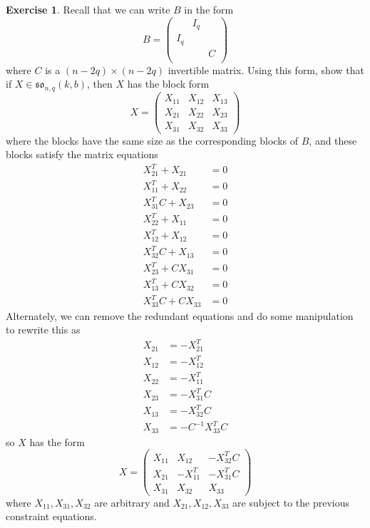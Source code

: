 \documentclass[12pt]{article}
\theoremstyle{definition}
\newtheorem{exercise}[theorem]{Exercise}
\newcommand{\inv}{^{-1}}
\begin{document}
\begin{exercise}
\label{general form so Lie algebra}
Recall that we can write $B$ in the form
\[
	B = 
	\begin{pmatrix}
		& I_q \\
		I_q \\
		&& C  \\
	\end{pmatrix}
\]
where $C$ is a $(n-2q) \times (n-2q)$ invertible matrix. Using this form, show that if $X \in \mathfrak{so}_{n,q}(k,b)$, then $X$ has the block form
\[
	X =
	\begin{pmatrix}
		X_{11} & X_{12} & X_{13} \\
		X_{21} & X_{22} & X_{23} \\
		X_{31} & X_{32} & X_{33}
	\end{pmatrix}
\]
where the blocks have the same size as the corresponding blocks of $B$, and these blocks satisfy the matrix equations
\begin{align*}
	X_{21}^T + X_{21} &= 0 \\
	X_{11}^T + X_{22} &= 0 \\
	X_{31}^T C + X_{23} &= 0 \\
	X_{22}^T + X_{11} &= 0 \\
	X_{12}^T + X_{12} &= 0 \\
	X_{32}^TC + X_{13} &= 0 \\
	X_{23}^T + CX_{31} &= 0 \\
	X_{13}^T + CX_{32} &= 0 \\
	X_{33}^T C + CX_{33} &= 0
\end{align*}
Alternately, we can remove the redundant equations and do some manipulation to rewrite this as
\begin{align*}
	X_{21} &= - X_{21}^T \\
	X_{12} &= - X_{12}^T \\
	X_{22} &= - X_{11}^T \\
	X_{23} &= - X_{31}^T C \\
	X_{13} &= - X_{32}^T C \\
	X_{33} &= - C \inv X_{33}^T C
\end{align*}
so $X$ has the form
\[
	X =
	\begin{pmatrix}
		X_{11} & X_{12} & -X_{32}^T C \\
		X_{21} & -X_{11}^T & -X_{31}^T C \\
		X_{31} & X_{32} & X_{33}
	\end{pmatrix}
\]
where $X_{11}, X_{31}, X_{32}$ are arbitrary and $X_{21}, X_{12}, X_{33}$ are subject to the previous constraint equations.
\end{exercise}
\end{document}
